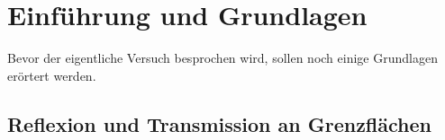 \section{Einführung und Grundlagen}
	Bevor der eigentliche Versuch besprochen wird, sollen noch einige Grundlagen erörtert werden.
\subsection{Reflexion und Transmission an Grenzflächen}
		
